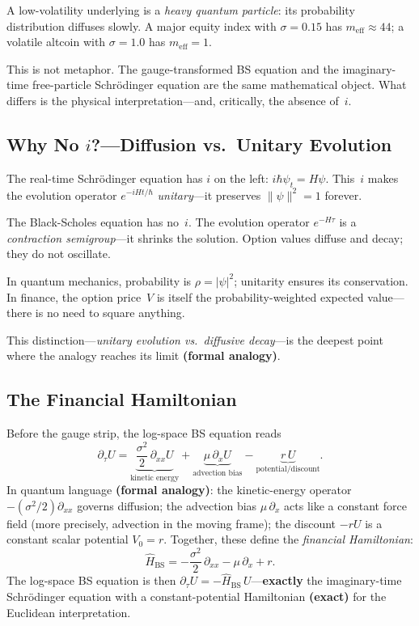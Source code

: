 A low-volatility underlying is a \emph{heavy quantum particle}: its probability distribution diffuses slowly.  A major equity index with $\sigma = 0.15$ has $m_{\text{eff}} \approx 44$; a volatile altcoin with $\sigma = 1.0$ has $m_{\text{eff}} = 1$.

This is not metaphor.  The gauge-transformed BS equation and the imaginary-time free-particle Schr\"{o}dinger equation are the same mathematical object.  What differs is the physical interpretation---and, critically, the absence of~$i$.

\subsection{\texorpdfstring{Why No $i$?---Diffusion vs.\ Unitary Evolution}{Why No i?---Diffusion vs. Unitary Evolution}}

The real-time Schr\"{o}dinger equation has $i$ on the left: $i\hbar\psi_t = H\psi$.  This~$i$ makes the evolution operator $e^{-iHt/\hbar}$ \emph{unitary}---it preserves $\|\psi\|^2 = 1$ forever.

The Black-Scholes equation has no~$i$.  The evolution operator $e^{-H\tau}$ is a \emph{contraction semigroup}---it shrinks the solution.  Option values diffuse and decay; they do not oscillate.

In quantum mechanics, probability is $\rho = |\psi|^2$; unitarity ensures its conservation.  In finance, the option price~$V$ is itself the probability-weighted expected value---there is no need to square anything.

This distinction---\emph{unitary evolution vs.\ diffusive decay}---is the deepest point where the analogy reaches its limit \textbf{(formal analogy)}.

\subsection{The Financial Hamiltonian}

Before the gauge strip, the log-space BS equation reads
\begin{equation}\label{eq:hamiltonian-decomp}
  \partial_\tau U
  = \underbrace{\frac{\sigma^2}{2}\,\partial_{xx} U}_{\text{kinetic energy}}
  + \underbrace{\mu\,\partial_x U}_{\text{advection bias}}
  - \underbrace{r\,U}_{\text{potential/discount}}.
\end{equation}
In quantum language \textbf{(formal analogy)}: the kinetic-energy operator $-(\sigma^2/2)\partial_{xx}$ governs diffusion; the advection bias $\mu\,\partial_x$ acts like a constant force field (more precisely, advection in the moving frame); the discount $-rU$ is a constant scalar potential $V_0 = r$.  Together, these define the \emph{financial Hamiltonian}:
\begin{equation}\label{eq:financial-hamiltonian}
  \hat{H}_{\text{BS}}
  = -\frac{\sigma^2}{2}\,\partial_{xx}
    - \mu\,\partial_x
    + r.
\end{equation}
The log-space BS equation is then $\partial_\tau U = -\hat{H}_{\text{BS}}\,U$---\textbf{exactly} the imaginary-time Schr\"{o}dinger equation with a constant-potential Hamiltonian \textbf{(exact)} for the Euclidean interpretation.

